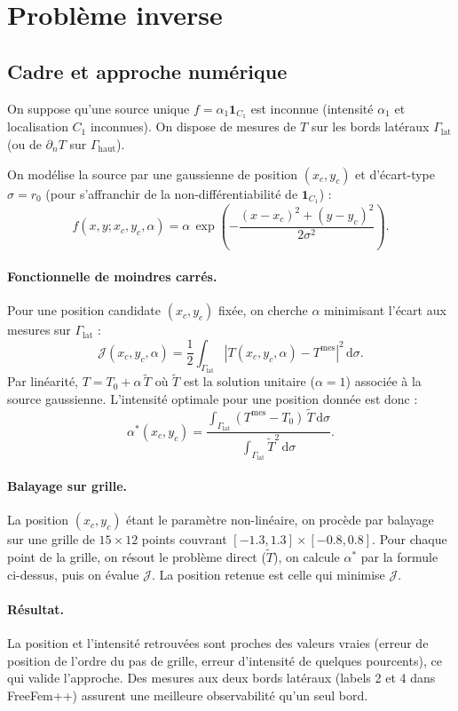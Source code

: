\documentclass[11pt,a4paper]{article}
\newcommand{\dd}{\,\mathrm{d}}
\begin{document}
\section{Problème inverse}

\subsection{Cadre et approche numérique}

On suppose qu'une source unique $f = \alpha_1 \mathbf{1}_{C_1}$ est inconnue (intensité $\alpha_1$ et localisation $C_1$ inconnues). On dispose de mesures de $T$ sur les bords latéraux $\Gamma_{\text{lat}}$ (ou de $\partial_n T$ sur $\Gamma_{\text{haut}}$).

On modélise la source par une gaussienne de position $(x_c, y_c)$ et d'écart-type $\sigma = r_0$ (pour s'affranchir de la non-différentiabilité de $\mathbf{1}_{C_1}$) :
\[
f(x, y; x_c, y_c, \alpha) = \alpha\,\exp\!\left(-\frac{(x-x_c)^2+(y-y_c)^2}{2\sigma^2}\right).
\]

\paragraph{Fonctionnelle de moindres carrés.}
Pour une position candidate $(x_c, y_c)$ fixée, on cherche $\alpha$ minimisant l'écart aux mesures sur $\Gamma_{\text{lat}}$ :
\[
\mathcal{J}(x_c, y_c, \alpha) = \frac{1}{2}\int_{\Gamma_{\text{lat}}} \left|T(x_c,y_c,\alpha) - T^{\text{mes}}\right|^2\dd\sigma.
\]
Par linéarité, $T = T_0 + \alpha\,\tilde{T}$ où $\tilde{T}$ est la solution unitaire ($\alpha=1$) associée à la source gaussienne. L'intensité optimale pour une position donnée est donc :
\[
\alpha^*(x_c,y_c) = \frac{\displaystyle\int_{\Gamma_{\text{lat}}} (T^{\text{mes}}-T_0)\,\tilde{T}\dd\sigma}{\displaystyle\int_{\Gamma_{\text{lat}}} \tilde{T}^2\dd\sigma}.
\]

\paragraph{Balayage sur grille.}
La position $(x_c, y_c)$ étant le paramètre non-linéaire, on procède par balayage sur une grille de $15\times12$ points couvrant $[-1.3, 1.3]\times[-0.8, 0.8]$. Pour chaque point de la grille, on résout le problème direct ($\tilde{T}$), on calcule $\alpha^*$ par la formule ci-dessus, puis on évalue $\mathcal{J}$. La position retenue est celle qui minimise $\mathcal{J}$.

\paragraph{Résultat.}
La position et l'intensité retrouvées sont proches des valeurs vraies (erreur de position de l'ordre du pas de grille, erreur d'intensité de quelques pourcents), ce qui valide l'approche. Des mesures aux deux bords latéraux (labels 2 et 4 dans FreeFem++) assurent une meilleure observabilité qu'un seul bord.
\end{document}
